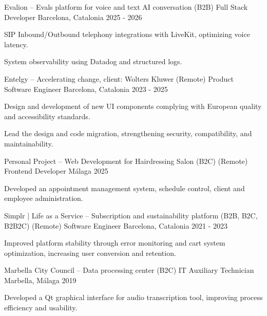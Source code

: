 
\begin{cventries}

    \cventry
    {Evalion – Evals platform for voice and text AI conversation (B2B)}
    {Full Stack Developer}
    {Barcelona, Catalonia}
    {2025 - 2026}
    {
    \begin{cvitems}
        \item{SIP Inbound/Outbound telephony integrations with LiveKit, optimizing voice latency.}
        \item{System observability using Datadog and structured logs.}
    \end{cvitems}
    }

    \cventry
    {Entelgy – Accelerating change, client: Wolters Kluwer (Remote)}
    {Product Software Engineer}
    {Barcelona, Catalonia}
    {2023 - 2025}
    {
    \begin{cvitems}
        \item{Design and development of new UI components complying with European quality and accessibility standards.}
        \item{Lead the design and code migration, strengthening security, compatibility, and maintainability.}
    \end{cvitems}
    }

    \cventry
    {Personal Project – Web Development for Hairdressing Salon (B2C) (Remote)}
    {Frontend Developer}
    {Málaga}
    {2025}
    {
    \begin{cvitems}
        \item{Developed an appointment management system, schedule control, client and employee administration.}
    \end{cvitems}
    }

    \cventry
    {Simplr | Life as a Service – Subscription and sustainability platform (B2B, B2C, B2B2C) (Remote)}
    {Software Engineer}
    {Barcelona, Catalonia}
    {2021 - 2023}
    {
    \begin{cvitems}
        \item{Improved platform stability through error monitoring and cart system optimization, increasing user conversion and retention.}
    \end{cvitems}
    }

    \cventry
    {Marbella City Council – Data processing center (B2C)}
    {IT Auxiliary Technician}
    {Marbella, Málaga}
    {2019}
    {
    \begin{cvitems}
        \item{Developed a Qt graphical interface for audio transcription tool, improving process efficiency and usability.}
    \end{cvitems}
    }

\end{cventries}
